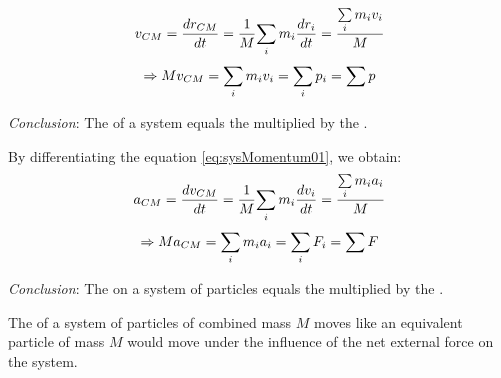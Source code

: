             \begin{equation} \label{eq:sysMomentum01}
                v_{CM} = \dfrac{dr_{CM}}{dt} = \dfrac{1}{M} {\sum\limits _{i} m_{i}} \dfrac{dr_{i}}{dt}
                = \dfrac{{\sum\limits _{i} m_{i}v_{i}}}{M}
            \end{equation}
            \begin{equation}
                \Rightarrow Mv_{CM} = {\sum\limits _{i} m_{i}v_{i}} = {\sum\limits _{i} p_{i}} = {\sum\limits p}
            \end{equation}
            \par \textit{Conclusion}: The  of a system equals the
             multiplied by the .
            \par By differentiating the equation \eqref{eq:sysMomentum01}, we obtain:
            \begin{equation}
                a_{CM} = \dfrac{dv_{CM}}{dt} = \dfrac{1}{M} {\sum\limits _{i} m_{i}} \dfrac{dv_{i}}{dt}
                = \dfrac{{\sum\limits _{i} m_{i}a_{i}}}{M}
            \end{equation}
            \begin{equation}
                \Rightarrow Ma_{CM} = {\sum\limits _{i} m_{i}a_{i}} = {\sum\limits _{i} F_{i}} = {\sum\limits F}
            \end{equation}
            \par \textit{Conclusion}: The  on a system of particles
            equals the  multiplied by the .
            \par The  of a system of particles of combined mass $M$ moves
            like an equivalent particle of mass $M$ would move under the influence of the net
            external force on the system.